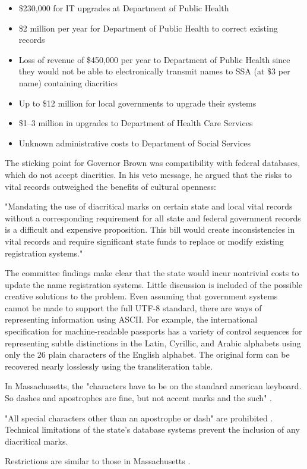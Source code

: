 \begin{itemize}

\item \$230,000 for IT upgrades at Department of Public Health
\item \$2 million per year for Department of Public Health to correct existing
records
\item Loss of revenue of \$450,000 per year to Department of Public Health since
they would not be able to electronically transmit names to SSA (at \$3 per name)
containing diacritics
\item Up to \$12 million for local governments to upgrade their systems
\item \$1--3 million in upgrades to Department of Health Care Services
\item Unknown administrative costs to Department of Social Services

\end{itemize}

The sticking point for Governor Brown was compatibility with federal databases,
which do not accept diacritics. In his veto message, he argued that the risks to
vital records outweighed the benefits of cultural openness:

"Mandating the use of diacritical marks on certain state and local vital records
without a corresponding requirement for all state and federal government records
is a difficult and expensive proposition. This bill would create inconsistencies
in vital records and require significant state funds to replace or modify
existing registration systems."

The committee findings make clear that the state would incur nontrivial costs to
update the name registration systems. Little discussion is included of the
possible creative solutions to the problem. Even assuming that government
systems cannot be made to support the full UTF-8 standard, there are ways of
representing information using ASCII. For example, the international
specification for machine-readable passports has a variety of control sequences
for representing subtle distinctions in the Latin, Cyrillic, and Arabic
alphabets using only the 26 plain characters of the English alphabet.  The
original form can be recovered nearly losslessly using the transliteration
table.

In Massachusetts, the "characters have to be on the standard american keyboard.
So dashes and apostrophes are fine, but not accent marks and the such"
\parencite{larson11}.

"All special characters other than an apostrophe or dash" are prohibited
\parencite{larson11}. Technical limitations of the state's database systems
prevent the inclusion of any diacritical marks.

Restrictions are similar to those in Massachusetts \parencite{larson11}.

